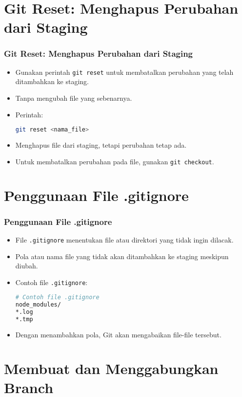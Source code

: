 \documentclass[aspectratio=169, table]{beamer}
\begin{document}
\section{Git Reset: Menghapus Perubahan dari Staging}
\begin{frame}[fragile]
\frametitle{Git Reset: Menghapus Perubahan dari Staging}
\begin{itemize}
\item Gunakan perintah \texttt{git reset} untuk membatalkan perubahan yang telah ditambahkan ke staging.
\item Tanpa mengubah file yang sebenarnya.
\item Perintah:
\begin{lstlisting}[language=bash]
git reset <nama_file>
\end{lstlisting}
\item Menghapus file dari staging, tetapi perubahan tetap ada.
\item Untuk membatalkan perubahan pada file, gunakan \texttt{git checkout}.
\end{itemize}
\end{frame}

\section{Penggunaan File .gitignore}

\begin{frame}[fragile]
\frametitle{Penggunaan File .gitignore}
\begin{itemize}
\item File \texttt{.gitignore} menentukan file atau direktori yang tidak ingin dilacak.
\item Pola atau nama file yang tidak akan ditambahkan ke staging meskipun diubah.
\item Contoh file \texttt{.gitignore}:
\begin{lstlisting}[language=bash]
# Contoh file .gitignore
node_modules/
*.log
*.tmp
\end{lstlisting}
\item Dengan menambahkan pola, Git akan mengabaikan file-file tersebut.
\end{itemize}
\end{frame}

\section{Membuat dan Menggabungkan Branch}
\end{document}
